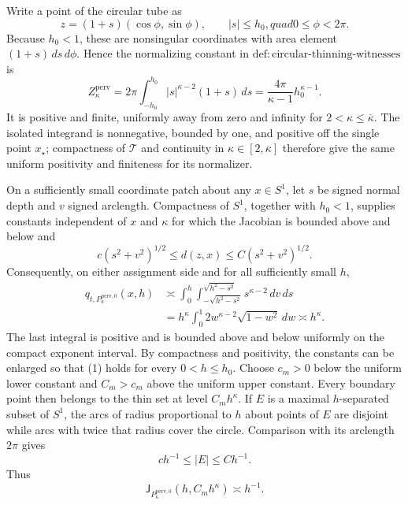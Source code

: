 Write a point of the circular tube as
\[
 z=(1+s)(\cos\phi,\sin\phi),\qquad |s|\le h_0,quad 0\le\phi<2\pi .
\]
Because \(h_0<1\), these are nonsingular coordinates with area element \((1+s)\,ds\,d\phi\).  Hence the normalizing constant in \(\mathrm{def:circular\text{-}thinning\text{-}witnesses}\) is
\[
 Z_{\kappa}^{\mathrm{perv}}
 =2\pi\int_{-h_0}^{h_0}|s|^{\kappa-2}(1+s)\,ds
 =\frac{4\pi}{\kappa-1}h_0^{\kappa-1}.
\]
It is positive and finite, uniformly away from zero and infinity for \(2<\kappa\le\overline\kappa\).  The isolated integrand is nonnegative, bounded by one, and positive off the single point \(x_{\star}\); compactness of \(\mathcal T\) and continuity in \(\kappa\in[2,\overline\kappa]\) therefore give the same uniform positivity and finiteness for its normalizer.

On a sufficiently small coordinate patch about any \(x\in S^1\), let \(s\) be signed normal depth and \(v\) signed arclength.  Compactness of \(S^1\), together with \(h_0<1\), supplies constants independent of \(x\) and \(\kappa\) for which the Jacobian is bounded above and below and
\[
 c(s^2+v^2)^{1/2}\le d(z,x)\le C(s^2+v^2)^{1/2}.
\]
Consequently, on either assignment side and for all sufficiently small \(h\),
\[
 \begin{aligned}
 q_{t,P_{\kappa}^{\mathrm{perv},0}}(x,h)
 &\asymp \int_0^h\int_{-\sqrt{h^2-s^2}}^{\sqrt{h^2-s^2}}
 s^{\kappa-2}\,dv\,ds\\
 &=h^{\kappa}\int_0^1 2w^{\kappa-2}\sqrt{1-w^2}\,dw
 \asymp h^{\kappa}.
 \end{aligned} \tag{1}
\]
The last integral is positive and is bounded above and below uniformly on the compact exponent interval.  By compactness and positivity, the constants can be enlarged so that (1) holds for every \(0<h\le h_0\).  Choose \(c_m>0\) below the uniform lower constant and \(C_m>c_m\) above the uniform upper constant.  Every boundary point then belongs to the thin set at level \(C_mh^{\kappa}\).  If \(E\) is a maximal \(h\)-separated subset of \(S^1\), the arcs of radius proportional to \(h\) about points of \(E\) are disjoint while arcs with twice that radius cover the circle.  Comparison with its arclength \(2\pi\) gives
\[
 c h^{-1}\le |E|\le C h^{-1}.
\]
Thus
\[
 \mathsf J_{P_{\kappa}^{\mathrm{perv},0}}(h,C_mh^{\kappa})\asymp h^{-1}. \tag{2}
\]

